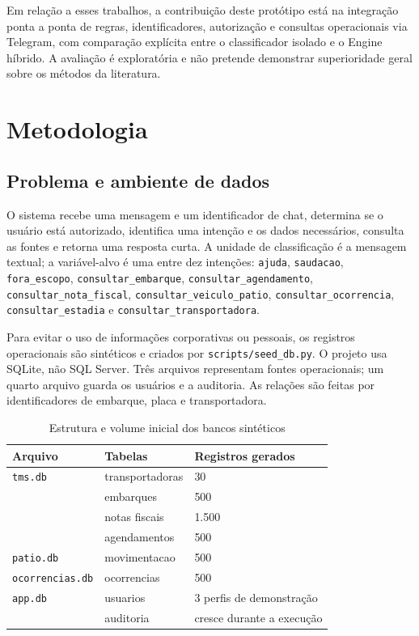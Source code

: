 \documentclass[conference]{IEEEtran}
\begin{document}
Em relação a esses trabalhos, a contribuição deste protótipo está na integração ponta a ponta de regras, identificadores, autorização e consultas operacionais via Telegram, com comparação explícita entre o classificador isolado e o Engine híbrido. A avaliação é exploratória e não pretende demonstrar superioridade geral sobre os métodos da literatura.

\section{Metodologia}

\subsection{Problema e ambiente de dados}

O sistema recebe uma mensagem e um identificador de chat, determina se o usuário está autorizado, identifica uma intenção e os dados necessários, consulta as fontes e retorna uma resposta curta. A unidade de classificação é a mensagem textual; a variável-alvo é uma entre dez intenções: \texttt{ajuda}, \texttt{saudacao}, \texttt{fora\_escopo}, \texttt{consultar\_embarque}, \texttt{consultar\_agendamento}, \texttt{consultar\_nota\_fiscal}, \texttt{consultar\_veiculo\_patio}, \texttt{consultar\_ocorrencia}, \texttt{consultar\_estadia} e \texttt{consultar\_transportadora}.

Para evitar o uso de informações corporativas ou pessoais, os registros operacionais são sintéticos e criados por \texttt{scripts/seed\_db.py}. O projeto usa SQLite, não SQL Server. Três arquivos representam fontes operacionais; um quarto arquivo guarda os usuários e a auditoria. As relações são feitas por identificadores de embarque, placa e transportadora.

\begin{table}[t]
\centering
\caption{Estrutura e volume inicial dos bancos sintéticos}
\label{tab:db}
\scriptsize
\begin{tabular}{lll}
\toprule
Arquivo & Tabelas & Registros gerados \\
\midrule
\texttt{tms.db} & transportadoras & 30 \\
 & embarques & 500 \\
 & notas fiscais & 1.500 \\
 & agendamentos & 500 \\
\texttt{patio.db} & movimentacao & 500 \\
\texttt{ocorrencias.db} & ocorrencias & 500 \\
\texttt{app.db} & usuarios & 3 perfis de demonstração \\
 & auditoria & cresce durante a execução \\
\bottomrule
\end{tabular}
\end{table}
\end{document}
